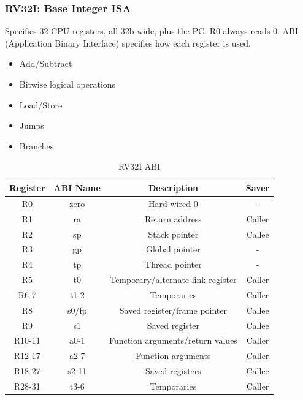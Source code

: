 \documentclass[10pt,a4paper]{article}
\begin{document}
      \subsubsection{RV32I: Base Integer ISA}
        Specifies 32 CPU registers, all 32b wide, plus the PC. R0 always reads 0. ABI (Application Binary Interface) specifies how each register is used.
        \begin{itemize}
          \item Add/Subtract
          \item Bitwise logical operations
          \item Load/Store
          \item Jumps
          \item Branches
        \end{itemize}
        \begin{table}[ht]
          \centering
          \begin{tabular}{|c|c|c|c|}
            \hline
            Register & ABI Name & Description                       & Saver  \\
            \hline
            R0       & zero     & Hard-wired 0                      & -      \\
            R1       & ra       & Return address                    & Caller \\
            R2       & sp       & Stack pointer                     & Callee \\
            R3       & gp       & Global pointer                    & -      \\
            R4       & tp       & Thread pointer                    & -      \\
            R5       & t0       & Temporary/alternate link register & Caller \\
            R6-7     & t1-2     & Temporaries                       & Caller \\
            R8       & s0/fp    & Saved register/frame pointer      & Callee \\
            R9       & s1       & Saved register                    & Callee \\
            R10-11   & a0-1     & Function arguments/return values  & Caller \\
            R12-17   & a2-7     & Function arguments                & Caller \\
            R18-27   & s2-11    & Saved registers                   & Callee \\
            R28-31   & t3-6     & Temporaries                       & Caller \\
            \hline
          \end{tabular}
          \caption{RV32I ABI}
        \end{table}
\end{document}
